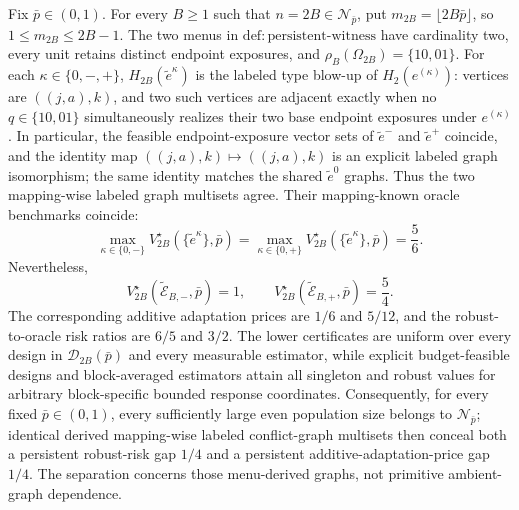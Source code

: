 Fix \(\bar p\in(0,1)\). For every \(B\ge1\) such that \(n=2B\in\mathcal N_{\bar p}\), put \(m_{2B}=\lfloor2B\bar p\rfloor\), so \(1\le m_{2B}\le2B-1\). The two menus in \(\mathrm{def{:}persistent\text{-}witness}\) have cardinality two, every unit retains distinct endpoint exposures, and \(\rho_B(\Omega_{2B})=\{10,01\}\). For each \(\kappa\in\{0,-,+\}\), \(H_{2B}(\widetilde e^\kappa)\) is the labeled type blow-up of \(H_2(e^{(\kappa)})\): vertices are \(((j,a),k)\), and two such vertices are adjacent exactly when no \(q\in\{10,01\}\) simultaneously realizes their two base endpoint exposures under \(e^{(\kappa)}\). In particular, the feasible endpoint-exposure vector sets of \(\widetilde e^-\) and \(\widetilde e^+\) coincide, and the identity map \(((j,a),k)\mapsto((j,a),k)\) is an explicit labeled graph isomorphism; the same identity matches the shared \(\widetilde e^0\) graphs. Thus the two mapping-wise labeled graph multisets agree. Their mapping-known oracle benchmarks coincide:
\[
 \max_{\kappa\in\{0,-\}}V_{2B}^\star(\{\widetilde e^\kappa\},\bar p)
 =\max_{\kappa\in\{0,+\}}V_{2B}^\star(\{\widetilde e^\kappa\},\bar p)
 =\frac56.
\]
Nevertheless,
\[
 V_{2B}^\star(\widetilde{\mathcal E}_{B,-},\bar p)=1,
 \qquad
 V_{2B}^\star(\widetilde{\mathcal E}_{B,+},\bar p)=\frac54.
\]
The corresponding additive adaptation prices are \(1/6\) and \(5/12\), and the robust-to-oracle risk ratios are \(6/5\) and \(3/2\). The lower certificates are uniform over every design in \(\mathcal D_{2B}(\bar p)\) and every measurable estimator, while explicit budget-feasible designs and block-averaged estimators attain all singleton and robust values for arbitrary block-specific bounded response coordinates. Consequently, for every fixed \(\bar p\in(0,1)\), every sufficiently large even population size belongs to \(\mathcal N_{\bar p}\); identical derived mapping-wise labeled conflict-graph multisets then conceal both a persistent robust-risk gap \(1/4\) and a persistent additive-adaptation-price gap \(1/4\). The separation concerns those menu-derived graphs, not primitive ambient-graph dependence.